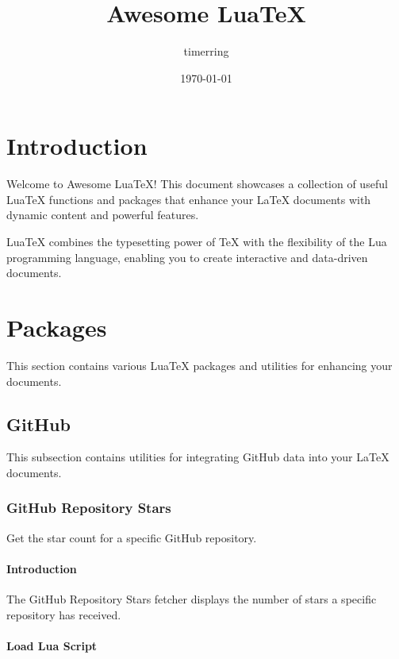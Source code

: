 \documentclass{article}
\begin{document}
\title{Awesome LuaTeX}
\author{timerring}
\date{\today}
\maketitle

\tableofcontents
\newpage

\section{Introduction}

Welcome to Awesome LuaTeX! This document showcases a collection of useful LuaTeX functions and packages that enhance your LaTeX documents with dynamic content and powerful features.

LuaTeX combines the typesetting power of TeX with the flexibility of the Lua programming language, enabling you to create interactive and data-driven documents.

\section{Packages}

This section contains various LuaTeX packages and utilities for enhancing your documents.

\subsection{GitHub}

This subsection contains utilities for integrating GitHub data into your LaTeX documents.

\subsubsection{GitHub Repository Stars}

Get the star count for a specific GitHub repository.

\paragraph{Introduction}

The GitHub Repository Stars fetcher displays the number of stars a specific repository has received.

\paragraph{Load Lua Script}
\end{document}
